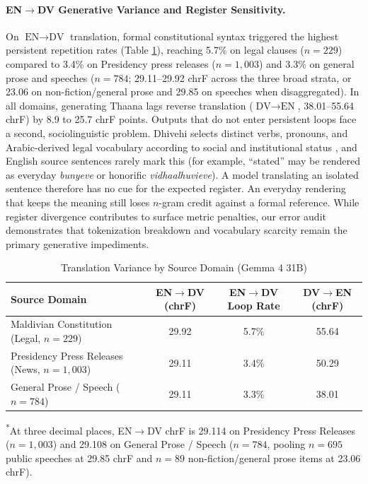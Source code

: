 \documentclass[acmsmall,review,anonymous]{acmart}
\begin{document}
\paragraph{EN$\rightarrow$DV Generative Variance and Register Sensitivity.}
On $\text{EN}\rightarrow\text{DV}$ translation, formal constitutional syntax triggered the highest persistent repetition rates (Table \ref{tab:domain}), reaching 5.7\% on legal clauses ($n=229$) compared to 3.4\% on Presidency press releases ($n=1,003$) and 3.3\% on general prose and speeches ($n=784$; 29.11--29.92 chrF across the three broad strata, or 23.06 on non-fiction/general prose and 29.85 on speeches when disaggregated). In all domains, generating Thaana lags reverse translation ($\text{DV}\rightarrow\text{EN}$, 38.01--55.64 chrF) by 8.9 to 25.7 chrF points. Outputs that do not enter persistent loops face a second, sociolinguistic problem. Dhivehi selects distinct verbs, pronouns, and Arabic-derived legal vocabulary according to social and institutional status \cite{gnanadesikan_dhivehi_2017}, and English source sentences rarely mark this (for example, ``stated'' may be rendered as everyday \textit{bunyeve} or honorific \textit{vidhaalhuvieve}). A model translating an isolated sentence therefore has no cue for the expected register. An everyday rendering that keeps the meaning still loses $n$-gram credit against a formal reference. While register divergence contributes to surface metric penalties, our error audit demonstrates that tokenization breakdown and vocabulary scarcity remain the primary generative impediments.

\begin{table}[t]
\centering
\small
\caption{Translation Variance by Source Domain (Gemma 4 31B)}
\label{tab:domain}
\begin{tabular}{lccc}
\toprule
\textbf{Source Domain} & \textbf{EN$\rightarrow$DV (chrF)} & \textbf{EN$\rightarrow$DV Loop Rate} & \textbf{DV$\rightarrow$EN (chrF)} \\
\midrule
Maldivian Constitution (Legal, $n=229$) & 29.92 & 5.7\% & 55.64 \\
Presidency Press Releases (News, $n=1,003$) & 29.11\rlap{\textsuperscript{*}} & 3.4\% & 50.29 \\
General Prose / Speech ($n=784$) & 29.11\rlap{\textsuperscript{*}} & 3.3\% & 38.01 \\
\bottomrule
\end{tabular}
\begin{flushleft}
\footnotesize
\textsuperscript{*}At three decimal places, EN$\rightarrow$DV chrF is 29.114 on Presidency Press Releases ($n=1,003$) and 29.108 on General Prose / Speech ($n=784$, pooling $n=695$ public speeches at 29.85 chrF and $n=89$ non-fiction/general prose items at 23.06 chrF).
\end{flushleft}
\end{table}
\end{document}
